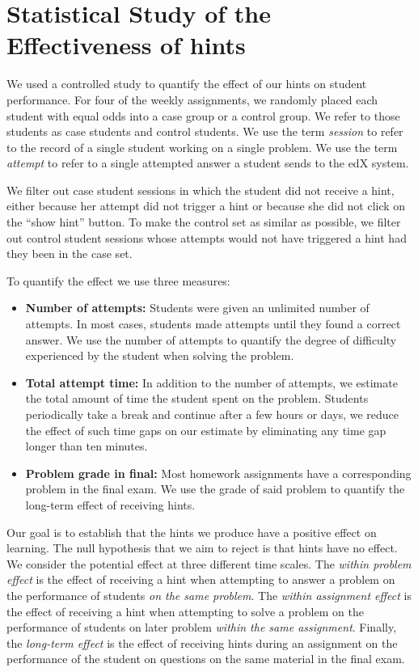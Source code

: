 \documentclass{sigchi}
\begin{document}
\section{Statistical Study of the Effectiveness of hints}

We used a controlled study to quantify the effect of our hints on
student performance. For four of the weekly assignments, we randomly
placed each student with equal odds into a case group or a control
group. We refer to those students as case students and control
students.  We use the term {\em session} to refer to the record of a
single student working on a single problem. We use the term {\em
  attempt} to refer to a single attempted answer a student sends to
the edX system.

We filter out case student sessions in which the student did not
receive a hint, either because her attempt did not trigger a hint or
because she did not click on the ``show hint'' button.  To make the
control set as similar as possible, we filter out control student
sessions whose attempts would not have triggered a hint had they been
in the case set.

To quantify the effect we use three measures:
\begin{itemize}
\item {\bf Number of attempts:} Students were given an unlimited number of attempts. In most cases, students made attempts until they found a correct answer. We use the number of attempts to quantify the degree of difficulty experienced by the student when solving the problem.

\item {\bf Total attempt time:} In addition to the number of attempts, we estimate the total amount of time the student spent on the problem. Students periodically take a break and continue after a few hours or days, we reduce the effect of such time gaps on our estimate by eliminating any time gap longer than ten minutes.
\item {\bf Problem grade in final:} Most homework assignments have a corresponding problem in the final exam. We use the grade of said problem to quantify the long-term effect of receiving hints. 
\end{itemize}

Our goal is to establish that the hints we produce have a positive effect on learning. The null hypothesis that we aim to reject is that hints have no effect. We consider the potential effect at three different time scales. The {\em within problem effect} is the effect of receiving a hint when attempting to answer a problem on the performance of students {\em on the same problem}. The {\em within assignment effect} is the effect of receiving a hint when attempting to solve a problem on the performance of students on later problem {\em within the same assignment}. Finally, the {\em long-term effect} is the effect of receiving hints during an assignment on the performance of the student on questions on the same material in the final exam.
\end{document}
